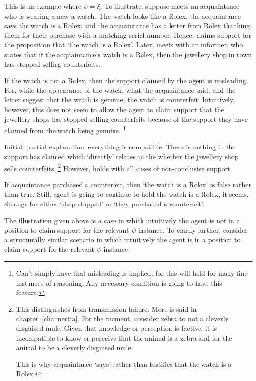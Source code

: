 \begin{note}[\nI{} example]
  {
    This is an example where \(\psi = \xi\).
  }
  To illustrate, suppose  meets an acquaintance who is wearing a new a watch.
  The watch looks like a Rolex, the acquaintance says the watch is a Rolex, and the acquaintance has a letter from Rolex thanking them for their purchase with a matching serial number.
  Hence,  claims support for the proposition that `the watch is a Rolex'.
  Later,  meets with an informer, who states that if the acquaintance's watch is a Rolex, then the jewellery shop in town has stopped selling counterfeits.

  If the watch is not a Rolex, then the support claimed by the agent is misleading.
  For, while the appearance of the watch, what the acquaintance said, and the letter suggest that the watch is genuine, the watch is counterfeit.
  Intuitively, however, this does not seem to allow the agent to claim support that the jewellery shops has stopped selling counterfeits because of the support they have claimed from the watch being genuine.\nolinebreak
  \footnote{
    Can't simply have that misleading is implied, for this will hold for many fine instances of reasoning.
    Any necessary condition is going to have this feature.
  }

  Initial, partial explanation, everything is compatible.
  There is nothing in the support   has claimed which `directly' relates to the whether the jewellery shop sells counterfeits.\nolinebreak
  \footnote{
    This distinguishes \nI{} from transmission failure.
    More is said in chapter~\ref{cha:inertia}.
    For the moment, consider zebra to not a cleverly disguised mule.
    Given that knowledge or perception is factive, it is incompatible to know or perceive that the animal is a zebra and for the animal to be a cleverly disguised mule.

    This is why acquaintance `says' rather than testifies that the watch is a Rolex.
  }
  However, holds with all cases of non-conclusive support.
\end{note}

\begin{note}
  If acquaintance purchased a counterfeit, then `the watch is a Rolex' is false rather than true.
  Still, agent is going to continue to hold the watch is a Rolex, it seems.
  Strange for either `shop stopped' or `they purchased a counterfeit'.

  The illustration given above is a case in which intuitively the agent is not in a position to claim support for the relevant \(\psi\) instance.
  To clarify further, consider a structurally similar scenario in which intuitively the agent is in a position to claim support for the relevant \(\psi\) instance.
\end{note}

